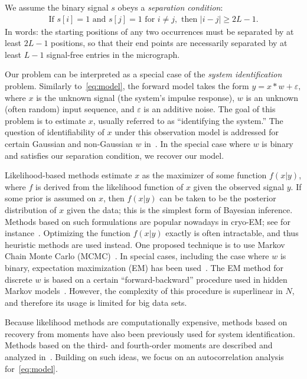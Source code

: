 \documentclass[9pt,twocolumn,twoside,lineno]{pnas-new}
\begin{document}
We assume the binary signal $s$ obeys a \emph{separation condition}:
\begin{align} 
\textrm{If } s[i] = 1 \textrm{ and } s[j] = 1 \textrm{ for } i \neq j, \textrm{ then } |i - j| \geq 2L-1.
\label{eq:spacing}
\end{align}
In words: the starting positions of any two occurrences  must be separated by at least $2L-1$ positions, so that their end points are necessarily separated by at least $L-1$ signal-free entries in the micrograph.

Our problem can be interpreted as a special case of the \emph{system identification} problem. Similarly to~\eqref{eq:model}, the
forward model takes the form
%
\begin{math}
%
y = x\ast w + \varepsilon,  
%
\end{math} 
%
where $x$ is the unknown signal (the system's impulse response), $w$ is an unknown (often random) input sequence, and $\varepsilon$ is an additive noise.
The goal of this problem is to estimate $x$, usually referred to as ``identifying the system.'' The question of identifiability of $x$ under this observation model is addressed for certain Gaussian and non-Gaussian $w$ in~\cite{benveniste1980robust,kormylo1983identifiability}. In the special case where $w$ is binary and satisfies our separation condition, we recover our model. 

Likelihood-based methods estimate $x$ as the maximizer of some function $f(x | y)$, where $f$ is derived from the likelihood function of $x$ given the observed signal $y$.  
If some prior is assumed on $x$, then $f(x|y)$ can be taken to be the posterior distribution of $x$ given the data; this is the simplest form of Bayesian inference.
Methods based on such formulations are popular nowadays in cryo-EM; see for instance~\cite{sigworth1998maximum,scheres2012relion}. 
Optimizing the function $f(x|y)$ exactly is often intractable, and thus heuristic methods are used instead. One proposed technique is to use Markov Chain Monte Carlo (MCMC)~\cite{cappe1999simulation}. 
In special cases, including the case where $w$ is binary, expectation maximization (EM) has been used~\cite{cappe1999simulation}. The EM method for discrete $w$ is based on a certain ``forward-backward'' procedure used in hidden Markov models~\cite{rabiner1989tutorial}. However, the complexity of this procedure is superlinear in $N$, and therefore its usage is limited for big data sets. 

Because likelihood methods are computationally expensive, methods based on recovery from moments have also been previously used for system identification. Methods based on the third- and fourth-order moments are described and analyzed in~\cite{lii1982deconvolution,giannakis1989identification,tugnait1984identification}. Building on such ideas, we focus on an autocorrelation analysis for~\eqref{eq:model}. %
\end{document}

